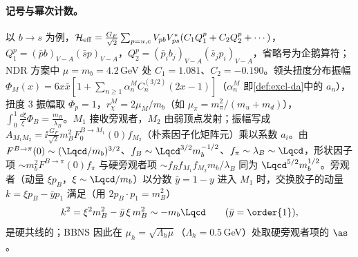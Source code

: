 \paragraph{记号与幂次计数。}
以 $b\to s$ 为例，$\mathcal H_{\rm eff}=\frac{G_F}{\sqrt2}\sum_{p=u,c}V_{pb}V_{ps}^*(C_1Q_1^p+C_2Q_2^p+\cdots)$，$Q_1^p=(\bar pb)_{V-A}(\bar sp)_{V-A}$，$Q_2^p=(\bar p_ib_j)_{V-A}(\bar s_jp_i)_{V-A}$，省略号为企鹅算符；NDR 方案中 $\mu=m_b=4.2$\,GeV 处 $C_1=1.081$、$C_2=-0.190$\cite[表~1]{BenekeEtAl2001}。领头扭度分布振幅 $\Phi_M(x)=6x\bar x[1+\sum_{n\ge1}\alpha_n^MC_n^{(3/2)}(2x-1)]$（$\alpha_n^M$ 即\cref{def:excl-da}中的 $a_n$），扭度 3 振幅取 $\Phi_p=1$，$r_\chi^M=2\mu_M/m_b$（如 $\mu_\pi=m_\pi^2/(m_u+m_d)$），$\int_0^1\frac{\dd\xi}{\xi}\Phi_B=\frac{m_B}{\lambda_B}$。$M_1$ 接收旁观者，$M_2$ 由弱顶点发射；振幅写成 $A_{M_1M_2}=\ii\frac{G_F}{\sqrt2}m_B^2F_0^{B\to M_1}(0)f_{M_2}$（朴素因子化矩阵元\cite[式~(11)]{BenekeNeubert2003}）乘以系数 $a_i$。由 $F^{B\to\pi}(0)\sim(\Lqcd/m_b)^{3/2}$、$f_B\sim\Lqcd^{3/2}m_b^{-1/2}$、$f_\pi\sim\lambda_B\sim\Lqcd$，形状因子项 $\sim m_b^2F^{B\to\pi}(0)f_\pi$ 与硬旁观者项 $\sim f_Bf_{M_1}f_{M_2}m_b/\lambda_B$ 同为 $\Lqcd^{5/2}m_b^{1/2}$。旁观者（动量 $\xi p_B$，$\xi\sim\Lqcd/m_b$）以分数 $\bar y=1-y$ 进入 $M_1$ 时，交换胶子的动量 $k=\xi p_B-\bar yp_1$ 满足（用 $2p_B\cdot p_1=m_B^2$）
\begin{equation}\label{eq:heavy-hc-gluon}
k^2=\xi^2m_B^2-\bar y\,\xi\,m_B^2\sim-m_b\Lqcd\qquad(\bar y=\order{1}),
\end{equation}
是硬共线的；BBNS 因此在 $\mu_h=\sqrt{\Lambda_h\mu}$（$\Lambda_h=0.5$\,GeV）处取硬旁观者项的 $\as$\cite{BenekeEtAl2001}。

